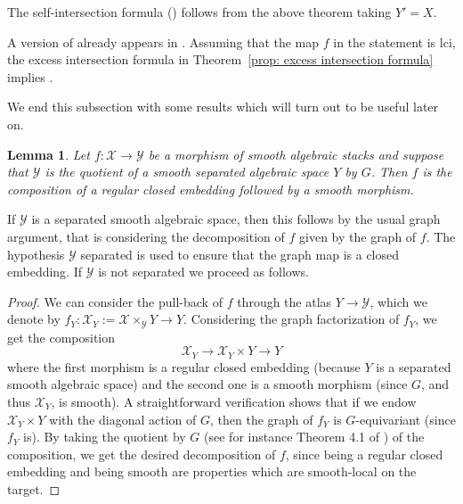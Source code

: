 \documentclass[12pt]{amsart}
\newcommand{\cX}{\mathcal{X}}
\newcommand{\cY}{\mathcal{Y}}
\newtheorem{Lemma}[theorem]{Lemma}
\theoremstyle{definition}
\begin{document}
The self-intersection formula () follows from the above theorem taking $Y'=X$. 

A version of  already appears in \cite[Theorem 3.1]{Thomason-blowup}. Assuming that the map $f$ in the statement is lci, the excess intersection formula in Theorem~\ref{prop: excess intersection formula} implies \cite[Theorem 3.1]{Thomason-blowup}.

We end this subsection with some results which will turn out to be useful later on.

\begin{Lemma}\label{lem:lci-factorization}
    Let $f:\cX \rightarrow \cY$ be a morphism of smooth algebraic stacks and suppose that $\cY$ is the quotient of a smooth separated algebraic space $Y$ by $G$. Then $f$ is the composition of a regular closed embedding followed by a smooth morphism.
\end{Lemma}

If $\cY$ is a separated smooth algebraic space, then this follows by the usual graph argument, that is considering the decomposition of $f$ given by the graph of $f$. The hypothesis $\cY$ separated is used to ensure that the graph map is a closed embedding. If $\cY$ is not separated we proceed as follows.

\begin{proof}

We can consider the pull-back of $f$ through the atlas $Y\rightarrow \cY$, which we denote by $f_Y:\cX_Y:=\cX \times_{\cY} Y\rightarrow Y$. Considering the graph factorization of $f_Y$, we get the composition 
 $$ \cX_Y \longrightarrow \cX_Y \times Y \longrightarrow Y$$
 where the first morphism is a regular closed embedding (because $Y$ is a separated smooth algebraic space) and the second one is a smooth morphism (since $G$, and thus $\cX_Y$, is smooth). A straightforward verification shows that if we endow $\cX_Y\times Y$ with the diagonal action of $G$, then the graph of $f_Y$ is $G$-equivariant (since $f_Y$ is). By taking the quotient by $G$ (see for instance Theorem 4.1 of \cite{Rom05}) of the composition, we get the desired decomposition of $f$, since being a regular closed embedding and being smooth are properties which are smooth-local on the target.
\end{proof}
\end{document}
